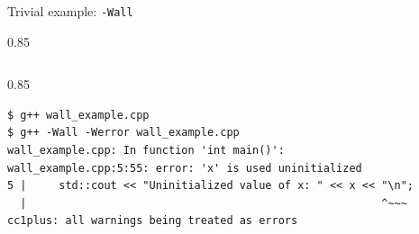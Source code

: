 \documentclass[aspectratio=1610]{beamer}
\newenvironment{centeredblock}[2][0.8\textwidth]
{ %
	\begin{center}
		\begin{varwidth}{#1} %
			\begin{block}{#2}
				\centering
			}
			{ %
			\end{block}
		\end{varwidth}
	\end{center}
}
\begin{document}
	\begin{frame}[fragile]{Trivial example: \texttt{-Wall}}
		\begin{centeredblock}[0.85 \textwidth]{}
			\inputminted{cpp}{../../02_sequential_programs/01_simplistic_introduction/wall_example.cpp}
		\end{centeredblock}
		
		\begin{centeredblock}[0.85 \textwidth]{}
			\begin{verbatim}
$ g++ wall_example.cpp
$ g++ -Wall -Werror wall_example.cpp
wall_example.cpp: In function 'int main()':
wall_example.cpp:5:55: error: 'x' is used uninitialized
5 |     std::cout << "Uninitialized value of x: " << x << "\n";
  |                                                       ^~~~
cc1plus: all warnings being treated as errors
			\end{verbatim}
		\end{centeredblock}
	\end{frame}
\end{document}
